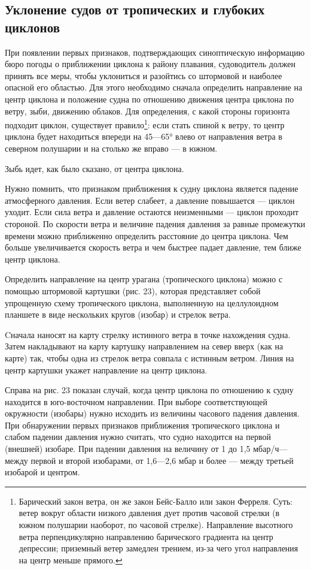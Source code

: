 \subsection{Уклонение судов от тропических и глубоких циклонов}
\label{sec:evasion_from_cyclones}

При появлении первых признаков, подтверждающих синоптическую информацию бюро погоды о приближении циклона к району плавания, судоводитель должен принять все меры, чтобы уклониться и разойтись со штормовой и наиболее опасной его областью. Для этого необходимо сначала определить направление на центр циклона и положение судна по отношению движения центра циклона по ветру, зыби, движению облаков. Для определения, с какой стороны горизонта подходит циклон, существует правило\footnote{Барический закон ветра, он же закон Бейс-Балло или закон Ферреля. Суть: ветер вокруг области низкого давления дует против часовой стрелки (в южном полушарии наоборот, по часовой стрелке). Направление высотного ветра перпендикулярно направлению барического градиента на центр депрессии; приземный ветер замедлен трением, из-за чего угол направления на центр меньше прямого.}: если стать спиной к ветру, то центр циклона будет находиться впереди на 45—65° влево от направления ветра в северном полушарии и на столько же вправо — в южном.

Зыбь идет, как было сказано, от центра циклона.

Нужно помнить, что признаком приближения к судну циклона является падение атмосферного давления. Если ветер слабеет, а давление повышается — циклон уходит. Если сила ветра и давление остаются неизменными — циклон проходит стороной. По скорости ветра и величине падения давления за равные промежутки времени можно приближенно определить расстояние до центра циклона. Чем больше увеличивается скорость ветра и чем быстрее падает давление, тем ближе центр циклона.

Определить направление на центр урагана (тропического циклона) можно с помощью штормовой картушки (рис. 23), которая представляет собой упрощенную схему тропического циклона, выполненную на целлулоидном планшете в виде нескольких кругов (изобар) и стрелок ветра.

Cначала наносят на карту стрелку истинного ветра в точке нахождения судна. Затем накладывают на карту картушку направлением на север вверх (как на карте) так, чтобы одна из стрелок ветра совпала с истинным ветром. Линия на центр картушки укажет направление на центр циклона.

Справа на рис. 23 показан случай, когда центр циклона по отношению к судну находится в юго-восточном направлении. При выборе соответствующей окружности (изобары) нужно исходить из величины часового падения давления. При обнаружении первых признаков приближения тропического циклона и слабом падении давления нужно считать, что судно находится на первой (внешней) изобаре. При падении давления на величину от 1 до 1,5 мбар/ч—между первой и второй изобарами, от 1,6—2,6 мбар и более — между третьей изобарой и центром.


